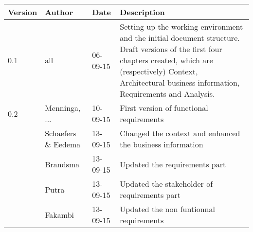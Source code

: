 \begin{longtable}{L{} L{} L{} L{}}
	\textbf{Version} & \textbf{Author}       & \textbf{Date} & \textbf{Description}                                                                                                                                                                                                       \\
			
	\toprule
	0.1              & all                   & 06-09-15      & Setting up the working environment and the initial document structure. Draft versions of the first four chapters created, which are (respectively) Context, Architectural business information, Requirements and Analysis. \\
	\midrule
			
	0.2              & Menninga, ...         & 10-09-15      & First version of functional requirements                                                                                                                                                                                   \\
			    
	                 & Schaefers \& Eedema   & 13-09-15      & Changed the context and enhanced the business information                                                                                                                                                                  \\
			
	                 & Brandsma              & 13-09-15      & Updated the requirements part                                                                                                                                                                                              \\
	                 & Putra                 & 13-09-15      & Updated the stakeholder of requirements part                                                                                                                                                                               \\
	                 & Fakambi 				& 13-09-15  	 & Updated the non funtionnal requirements \\
	\midrule
			

\end{longtable}
